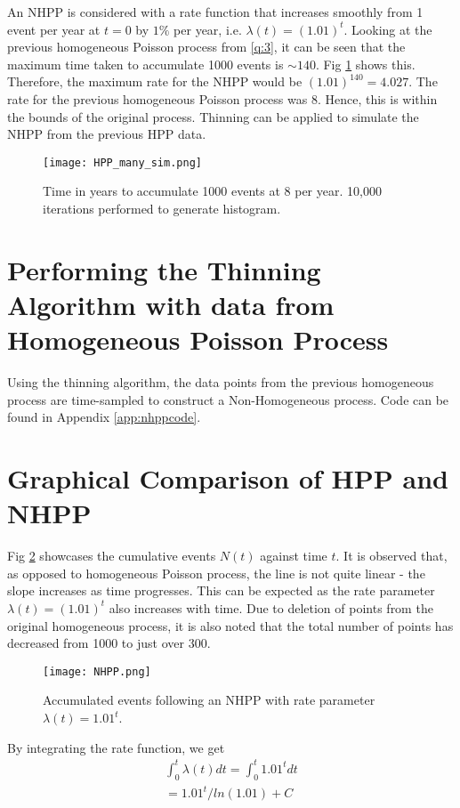 \documentclass[%
 reprint,
 amsmath,amssymb,
 aps,
]{revtex4-2}
\theoremstyle{definition}
\begin{document}
An NHPP is considered with a rate function that increases smoothly from 1 event per year at $t = 0$ by $1\%$ per year, i.e. $\lambda(t) = (1.01)^t$. Looking at the previous homogeneous Poisson process from \ref{q:3}, it can be seen that the maximum time taken to accumulate 1000 events is $\sim140$. Fig \ref{fig:hpp_many_sim} shows this. Therefore, the maximum rate for the NHPP would be $(1.01)^{140} = 4.027$. The rate for the previous homogeneous Poisson process was 8. Hence, this is within the bounds of the original process. Thinning can be applied to simulate the NHPP from the previous HPP data.

\begin{figure}
\centering
\texttt{[image: HPP\_many\_sim.png]}
\caption{\label{fig:hpp_many_sim}Time in years to accumulate 1000 events at 8 per year. 10,000 iterations performed to generate histogram.}
\end{figure}

\section{\label{q:5}Performing the Thinning Algorithm with data from Homogeneous Poisson Process}
Using the thinning algorithm, the data points from the previous homogeneous process are time-sampled to construct a Non-Homogeneous process. Code can be found in Appendix \ref{app:nhppcode}.

\section{\label{q:6}Graphical Comparison of HPP and NHPP}
Fig \ref{fig:nhpp} showcases the cumulative events $N(t)$ against time $t$. It is observed that, as opposed to homogeneous Poisson process, the line is not quite linear - the slope increases as time progresses. This can be expected as the rate parameter $\lambda(t) = (1.01)^t$ also increases with time. Due to deletion of points from the original homogeneous process, it is also noted that the total number of points has decreased from 1000 to just over 300.

\begin{figure}
\centering
\texttt{[image: NHPP.png]}
\caption{\label{fig:nhpp}Accumulated events following an NHPP with rate parameter $\lambda(t) = 1.01^t$.}
\end{figure}

By integrating the rate function, we get 
\begin{gather*}
\int_{0}^{t}\lambda(t)dt = \int_{0}^{t}1.01^tdt\\
=1.01^t/ln(1.01) + C
\end{gather*}
\end{document}
